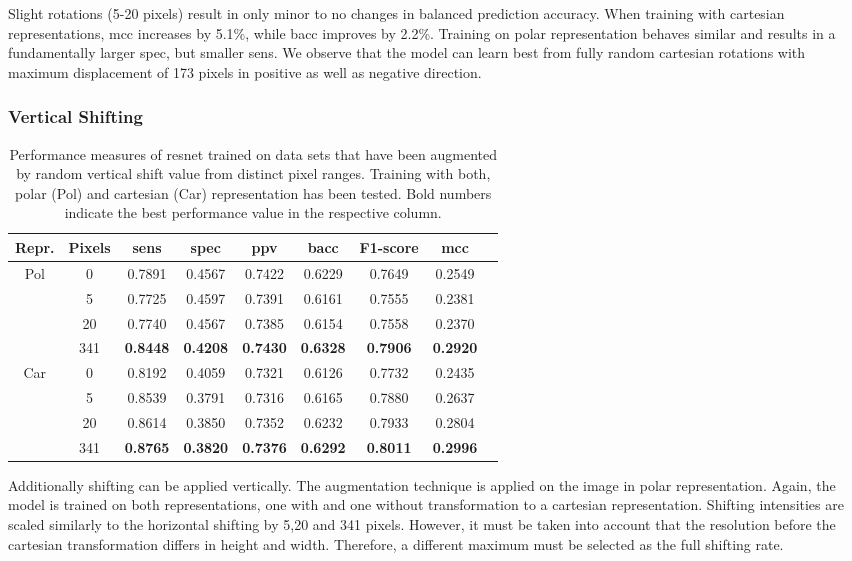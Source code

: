 Slight rotations (5-20 pixels) result in only minor to no changes in balanced prediction accuracy. When training with cartesian representations, \acrshort{mcc} increases by 5.1\%, while \acrshort{bacc} improves by 2.2\%. Training on polar representation behaves similar and results in a fundamentally larger \acrshort{spec}, but smaller \acrshort{sens}. We observe that the model can learn best from fully random cartesian rotations with maximum displacement of 173 pixels in positive as well as negative direction.

\subsubsection{Vertical Shifting}

\begin{table}[H]
    \centering
    \begin{tabular}{|c|c|c|c|c|c|c|c|c|}
        \hline
        Repr. & Pixels & \acrshort{sens} & \acrshort{spec} & \acrshort{ppv} & \acrshort{bacc} & F1-score & \acrshort{mcc} \\\hline\hline
        \multirow{4}{2em}{Pol} & 0 & 0.7891 & 0.4567 & 0.7422 & 0.6229 & 0.7649 & 0.2549 \\
         & 5 & 0.7725 & 0.4597 & 0.7391 & 0.6161 & 0.7555 & 0.2381 \\
         & 20 & 0.7740 & 0.4567 & 0.7385 & 0.6154 & 0.7558 & 0.2370 \\
         & 341 & \textbf{0.8448} & \textbf{0.4208} & \textbf{0.7430} & \textbf{0.6328} & \textbf{0.7906} & \textbf{0.2920} \\
        \hline
        \multirow{4}{2em}{Car} & 0 & 0.8192 & 0.4059 & 0.7321 & 0.6126 & 0.7732 & 0.2435 \\
         & 5 & 0.8539 & 0.3791 & 0.7316 & 0.6165 & 0.7880 & 0.2637 \\
         & 20 & 0.8614 & 0.3850 & 0.7352 & 0.6232 & 0.7933 & 0.2804 \\
         & 341 & \textbf{0.8765} & \textbf{0.3820} & \textbf{0.7376} & \textbf{0.6292} & \textbf{0.8011} & \textbf{0.2996} \\
        \hline
    \end{tabular}
    \caption[Vertical shifting and fold]{Performance measures of \acrshort{resnet} trained on data sets that have been augmented by random vertical shift value from distinct pixel ranges. Training with both, polar (Pol) and cartesian (Car) representation has been tested. Bold numbers indicate the best performance value in the respective column.}
    \label{tab:da_results2}
\end{table}
Additionally shifting can be applied vertically. The augmentation technique is applied on the image in polar representation. Again, the model is trained on both representations, one with and one without transformation to a cartesian representation. Shifting intensities are scaled similarly to the horizontal shifting by 5,20 and 341 pixels. However, it must be taken into account that the resolution before the cartesian transformation differs in height and width. Therefore, a different maximum must be selected as the full shifting rate.

